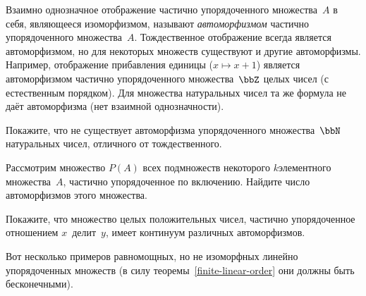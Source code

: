 \problskip

Взаимно однозначное отображение частично упорядоченного
множества~$A$ в себя, являющееся изоморфизмом,
называют
\emph{автоморфизмом} частично
упорядоченного множества~$A$.
Тождественное отображение всегда является автоморфизмом, но
для некоторых множеств существуют и другие автоморфизмы. Например,
отображение прибавления единицы ($x\mapsto x+1$) является
автоморфизмом частично упорядоченного множества~$\bbZ$
целых чисел (с естественным порядком). Для множества
натуральных чисел та же формула не даёт автоморфизма
(нет взаимной однозначности).

\begin{problem}
Покажите, что не существует автоморфизма упорядоченного множества~$\bbN$
натуральных чисел, отличного от тождественного.
\end{problem}

\begin{problem}
Рассмотрим множество $P(A)$ всех подмножеств некоторого
$k$\д элементного множества~$A$, частично упорядоченное
по включению. Найдите число автоморфизмов этого множества.
\end{problem}

\begin{problem}
Покажите, что множество целых положительных чисел, частично
упорядоченное отношением  $x$~делит~$y$, имеет континуум
различных автоморфизмов.
\end{problem}

Вот несколько примеров равномощных, но не изоморфных
линейно упорядоченных множеств (в
силу теоремы~\ref{finite-linear-order} они должны быть бесконечными).

